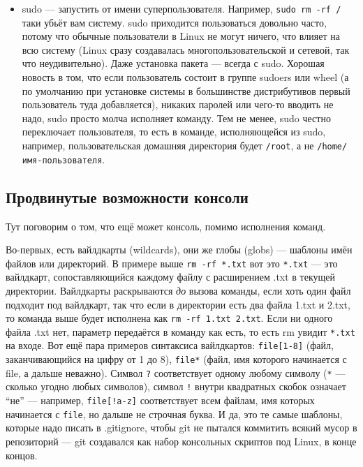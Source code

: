 \documentclass{../../text-style}
\begin{document}
\begin{itemize}
    \item sudo --- запустить от имени суперпользователя.
        Например, \verb|sudo rm -rf /| таки убьёт вам систему.
        sudo приходится пользоваться довольно часто, потому что обычные пользователи в Linux не могут ничего, что влияет на всю систему (Linux сразу создавалась многопользовательской и сетевой, так что неудивительно).
        Даже установка пакета --- всегда с sudo.
        Хорошая новость в том, что если пользователь состоит в группе sudoers или wheel (а по умолчанию при установке системы в большинстве дистрибутивов первый пользователь туда добавляется), никаких паролей или чего-то вводить не надо, sudo просто молча исполняет команду.
        Тем не менее, sudo честно переключает пользователя, то есть в команде, исполняющейся из sudo, например, пользовательская домашняя директория будет \verb|/root|, а не \verb|/home/имя-пользователя|.
\end{itemize}

\subsection{Продвинутые возможности консоли}

Тут поговорим о том, что ещё может консоль, помимо исполнения команд.

Во-первых, есть вайлдкарты (wildcards), они же глобы (globs) --- шаблоны имён файлов или директорий.
В примере выше \verb|rm -rf *.txt| вот это \verb|*.txt| --- это вайлдкарт, сопоставляющийся каждому файлу с расширением .txt в текущей директории.
Вайлдкарты раскрываются \emph{до} вызова команды, если хоть один файл подходит под вайлдкарт, так что если в директории есть два файла 1.txt и 2.txt, то команда выше будет исполнена как \verb|rm -rf 1.txt 2.txt|. 
Если ни одного файла .txt нет, параметр передаётся в команду как есть, то есть rm увидит \verb|*.txt| на входе.
Вот ещё пара примеров синтаксиса вайлдкартов: \verb|file[1-8]| (файл, заканчивающийся на цифру от 1 до 8), \texttt{file*} (файл, имя которого начинается с file, а дальше неважно).
Символ \verb|?| соответствует одному любому символу (\verb|*| --- сколько угодно любых символов), символ \verb|!| внутри квадратных скобок означает \enquote{не} --- например, \verb|file[!a-z]| соответствует всем файлам, имя которых начинается с \verb|file|, но дальше не строчная буква.
И да, это те самые шаблоны, которые надо писать в .gitignore, чтобы git не пытался коммитить всякий мусор в репозиторий --- git создавался как набор консольных скриптов под Linux, в конце концов.
\end{document}
